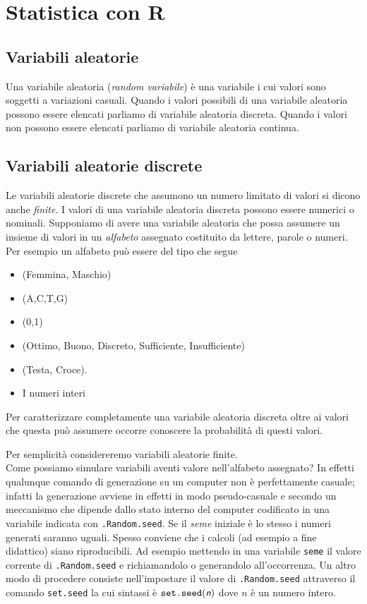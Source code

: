 \documentclass[onecolumn,12pt]{book}\usepackage[]{graphicx}\usepackage[]{color}
\newcommand{\varia}[1]{\textsl{\textsf{#1}}}
\begin{document}
\chapter{Statistica con \textsf{R}}
\section{Variabili aleatorie}
Una variabile aleatoria (\emph{random variabile}) \`e
 una variabile i cui valori sono soggetti a variazioni casuali. Quando i valori possibili di una variabile aleatoria  possono essere elencati parliamo di variabile aleatoria discreta. Quando i valori non possono essere elencati parliamo di variabile aleatoria continua.

\section{Variabili aleatorie discrete}
Le variabili aleatorie  discrete che  assumono un numero limitato di valori si dicono anche \emph{finite}.  I valori di una variabile aleatoria discreta possono essere numerici o nominali.
 Supponiamo di avere una variabile aleatoria che possa assumere un insieme di valori in  un \emph{alfabeto} assegnato costituito da lettere, parole o numeri. Per esempio un alfabeto pu\`o essere del tipo che segue
\begin{itemize}
\item{}(Femmina, Maschio)
\item{}(A,C,T,G)
\item{} (0,1)
\item{}(Ottimo, Buono, Discreto, Sufficiente, Insufficiente)
\item{} (Testa, Croce).
\item{} I numeri interi
\end{itemize}
Per caratterizzare completamente una variabile aleatoria discreta oltre ai valori che questa pu\`o  assumere occorre conoscere la probabilit\`a  di questi valori.


Per semplicit\`a considereremo variabili aleatorie finite.\\
Come possiamo simulare variabili aventi valore nell'alfabeto assegnato?
In effetti qualunque comando di generazione su un computer non \`e perfettamente casuale; infatti la generazione avviene in effetti in modo pseudo-casuale e  secondo un meccanismo che dipende dallo stato interno del computer codificato in una variabile indicata con \texttt{.Random.seed}. Se il {\it seme} iniziale \`e lo stesso i numeri generati saranno uguali. Spesso conviene che i calcoli (ad esempio a fine didattico) siano riproducibili. Ad esempio mettendo in una variabile \texttt{seme} il valore corrente di \texttt{.Random.seed} e richiamandolo o generandolo all'occorrenza.  
Un altro modo di procedere consiste nell'impostare il valore di 
\texttt{.Random.seed} attraverso il comando 
\texttt{set.seed}  la cui sintassi \`e 
$\texttt{set.seed}(\varia{n})$ dove $n$ \`e un numero intero.
 
\end{document}
